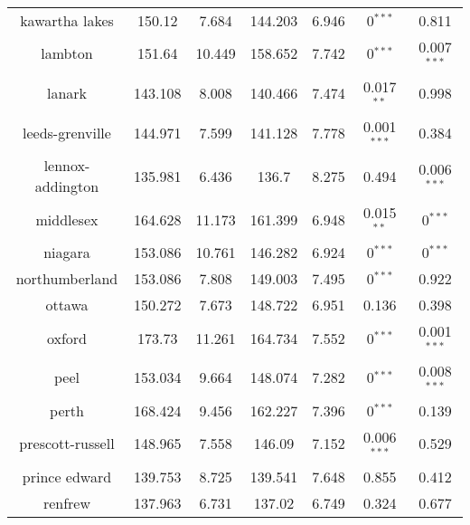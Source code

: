\begin{table}[]
\begin{tabular}{|c|cc|cc|cc|}
kawartha lakes            & 150.12    & 7.684             & 144.203   & 6.946             & 0$^{***}$     & 0.811                         \\
lambton                   & 151.64    & 10.449            & 158.652   & 7.742             & 0$^{***}$     & 0.007$^{***}$ \\
lanark                    & 143.108   & 8.008             & 140.466   & 7.474             & 0.017$^{**}$  & 0.998                         \\
leeds-grenville           & 144.971   & 7.599             & 141.128   & 7.778             & 0.001$^{***}$ & 0.384                         \\
lennox-addington          & 135.981   & 6.436             & 136.7     & 8.275             & 0.494                         & 0.006$^{***}$ \\
middlesex                 & 164.628   & 11.173            & 161.399   & 6.948             & 0.015$^{**}$  & 0$^{***}$     \\
niagara                   & 153.086   & 10.761            & 146.282   & 6.924             & 0$^{***}$     & 0$^{***}$     \\
northumberland            & 153.086   & 7.808             & 149.003   & 7.495             & 0$^{***}$     & 0.922                         \\
ottawa                    & 150.272   & 7.673             & 148.722   & 6.951             & 0.136                         & 0.398                         \\
oxford                    & 173.73    & 11.261            & 164.734   & 7.552             & 0$^{***}$     & 0.001$^{***}$ \\
peel                      & 153.034   & 9.664             & 148.074   & 7.282             & 0$^{***}$     & 0.008$^{***}$ \\
perth                     & 168.424   & 9.456             & 162.227   & 7.396             & 0$^{***}$     & 0.139                         \\
prescott-russell          & 148.965   & 7.558             & 146.09    & 7.152             & 0.006$^{***}$ & 0.529                         \\
prince edward             & 139.753   & 8.725             & 139.541   & 7.648             & 0.855                         & 0.412                         \\
renfrew                   & 137.963   & 6.731             & 137.02    & 6.749             & 0.324                         & 0.677                         \\

\end{tabular}
\end{table}
